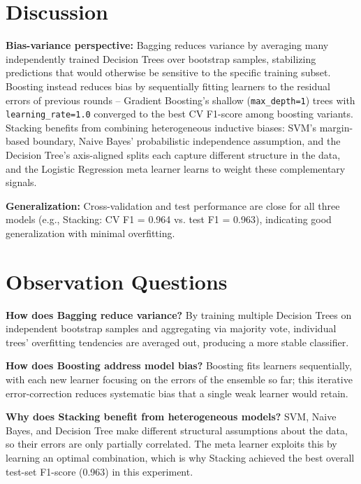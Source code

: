 \documentclass[11pt,a4paper]{article}
\begin{document}
\section{Discussion}

\textbf{Bias-variance perspective:} Bagging reduces variance by averaging many independently trained
Decision Trees over bootstrap samples, stabilizing predictions that would otherwise be sensitive to
the specific training subset. Boosting instead reduces bias by sequentially fitting learners to the
residual errors of previous rounds -- Gradient Boosting's shallow (\texttt{max\_depth=1}) trees with
\texttt{learning\_rate=1.0} converged to the best CV F1-score among boosting variants. Stacking
benefits from combining heterogeneous inductive biases: SVM's margin-based boundary, Naive Bayes'
probabilistic independence assumption, and the Decision Tree's axis-aligned splits each capture
different structure in the data, and the Logistic Regression meta learner learns to weight these
complementary signals.

\textbf{Generalization:} Cross-validation and test performance are close for all three models
(e.g., Stacking: CV F1 = 0.964 vs. test F1 = 0.963), indicating good generalization with minimal
overfitting.

\section{Observation Questions}

\textbf{How does Bagging reduce variance?}
By training multiple Decision Trees on independent bootstrap samples and aggregating via majority
vote, individual trees' overfitting tendencies are averaged out, producing a more stable classifier.

\textbf{How does Boosting address model bias?}
Boosting fits learners sequentially, with each new learner focusing on the errors of the ensemble so
far; this iterative error-correction reduces systematic bias that a single weak learner would retain.

\textbf{Why does Stacking benefit from heterogeneous models?}
SVM, Naive Bayes, and Decision Tree make different structural assumptions about the data, so their
errors are only partially correlated. The meta learner exploits this by learning an optimal
combination, which is why Stacking achieved the best overall test-set F1-score (0.963) in this
experiment.
\end{document}
